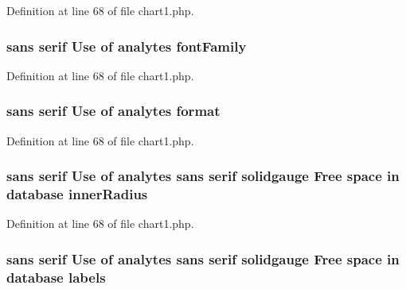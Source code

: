 Definition at line 68 of file chart1.\-php.

\hypertarget{chart1_8php_a61b4126a795dc35aff6108a017a6c950}{
\subsubsection[{font\-Family}]{ sans serif Use of analytes font\-Family}}\label{chart1_8php_a61b4126a795dc35aff6108a017a6c950}


Definition at line 68 of file chart1.\-php.

\hypertarget{chart1_8php_a8dc92044d4a2908bbcf6bab430b0fcad}{
\subsubsection[{format}]{ sans serif Use of analytes format}}\label{chart1_8php_a8dc92044d4a2908bbcf6bab430b0fcad}


Definition at line 68 of file chart1.\-php.

\hypertarget{chart1_8php_a89f0143e254bf461b321ee5b6b1fa90b}{
\subsubsection[{inner\-Radius}]{ sans serif Use of analytes sans serif solidgauge Free space in database inner\-Radius}}\label{chart1_8php_a89f0143e254bf461b321ee5b6b1fa90b}


Definition at line 68 of file chart1.\-php.

\hypertarget{chart1_8php_aa76eb72ed8894c2f5448631b03964879}{
\subsubsection[{labels}]{ sans serif Use of analytes sans serif solidgauge Free space in database labels}}\label{chart1_8php_aa76eb72ed8894c2f5448631b03964879}


